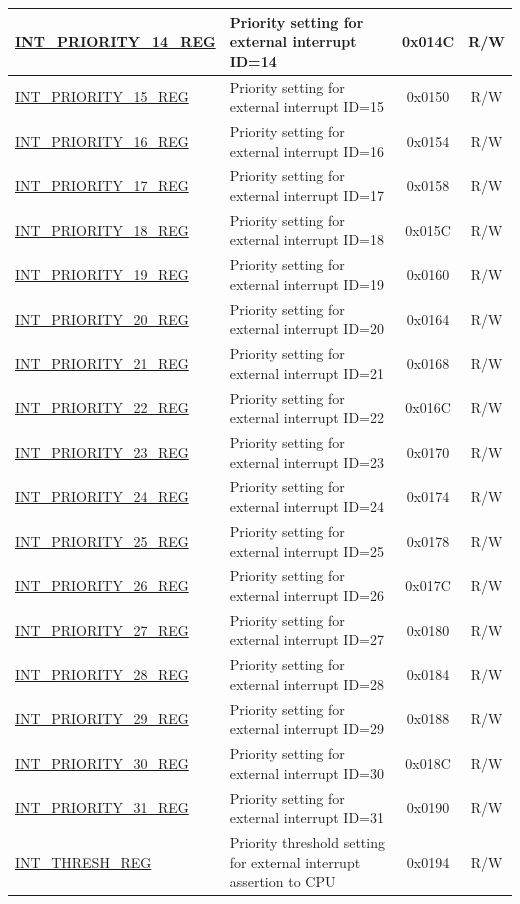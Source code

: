 \begin{longtable}{ | p{4.0cm} | p{8.4cm} | c | c| }
\hyperref[regdesc:INTPRIORITYREG]{INT\_PRIORITY\_14\_REG} & Priority setting for external interrupt ID=14 & 0x014C & R/W \\\hline
\hyperref[regdesc:INTPRIORITYREG]{INT\_PRIORITY\_15\_REG} & Priority setting for external interrupt ID=15 & 0x0150 & R/W \\\hline
\hyperref[regdesc:INTPRIORITYREG]{INT\_PRIORITY\_16\_REG} & Priority setting for external interrupt ID=16 & 0x0154 & R/W \\\hline
\hyperref[regdesc:INTPRIORITYREG]{INT\_PRIORITY\_17\_REG} & Priority setting for external interrupt ID=17 & 0x0158 & R/W \\\hline
\hyperref[regdesc:INTPRIORITYREG]{INT\_PRIORITY\_18\_REG} & Priority setting for external interrupt ID=18 & 0x015C & R/W \\\hline
\hyperref[regdesc:INTPRIORITYREG]{INT\_PRIORITY\_19\_REG} & Priority setting for external interrupt ID=19 & 0x0160 & R/W \\\hline
\hyperref[regdesc:INTPRIORITYREG]{INT\_PRIORITY\_20\_REG} & Priority setting for external interrupt ID=20 & 0x0164 & R/W \\\hline
\hyperref[regdesc:INTPRIORITYREG]{INT\_PRIORITY\_21\_REG} & Priority setting for external interrupt ID=21 & 0x0168 & R/W \\\hline
\hyperref[regdesc:INTPRIORITYREG]{INT\_PRIORITY\_22\_REG} & Priority setting for external interrupt ID=22 & 0x016C & R/W \\\hline
\hyperref[regdesc:INTPRIORITYREG]{INT\_PRIORITY\_23\_REG} & Priority setting for external interrupt ID=23 & 0x0170 & R/W \\\hline
\hyperref[regdesc:INTPRIORITYREG]{INT\_PRIORITY\_24\_REG} & Priority setting for external interrupt ID=24 & 0x0174 & R/W \\\hline
\hyperref[regdesc:INTPRIORITYREG]{INT\_PRIORITY\_25\_REG} & Priority setting for external interrupt ID=25 & 0x0178 & R/W \\\hline
\hyperref[regdesc:INTPRIORITYREG]{INT\_PRIORITY\_26\_REG} & Priority setting for external interrupt ID=26 & 0x017C & R/W \\\hline
\hyperref[regdesc:INTPRIORITYREG]{INT\_PRIORITY\_27\_REG} & Priority setting for external interrupt ID=27 & 0x0180 & R/W \\\hline
\hyperref[regdesc:INTPRIORITYREG]{INT\_PRIORITY\_28\_REG} & Priority setting for external interrupt ID=28 & 0x0184 & R/W \\\hline
\hyperref[regdesc:INTPRIORITYREG]{INT\_PRIORITY\_29\_REG} & Priority setting for external interrupt ID=29 & 0x0188 & R/W \\\hline
\hyperref[regdesc:INTPRIORITYREG]{INT\_PRIORITY\_30\_REG} & Priority setting for external interrupt ID=30 & 0x018C & R/W \\\hline
\hyperref[regdesc:INTPRIORITYREG]{INT\_PRIORITY\_31\_REG} & Priority setting for external interrupt ID=31 & 0x0190 & R/W \\\hline
\hyperref[regdesc:INTTHRESHREG]{INT\_THRESH\_REG} & Priority threshold setting for external interrupt assertion to CPU & 0x0194 & R/W \\\hline
\end{longtable}
